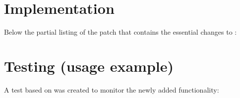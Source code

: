 \documentclass{InsightArticle}
\begin{document}
\section{Implementation}
\label{sec:impl}


Below the partial listing of the patch that contains the essential changes to :




\section{Testing (usage example)}
\label{sec:test}


A test based on  was created to monitor the newly added functionality:





%
%

\renewcommand{\UrlBreaks}{\do\-\do\_}%
%

\end{document}
